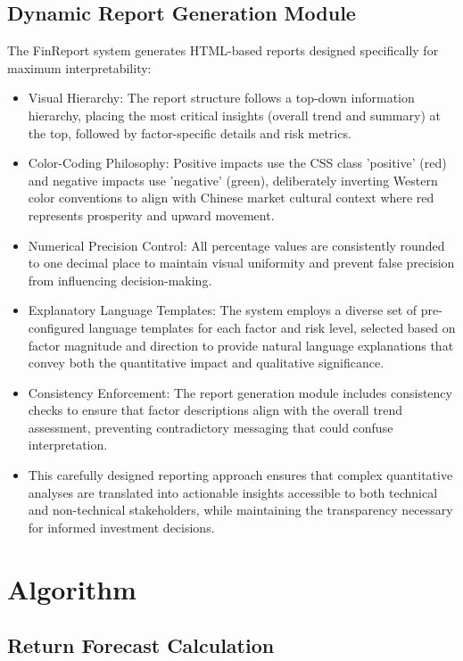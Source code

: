 \documentclass[3p,times,procedia]{elsarticle}
\begin{document}
\subsection{Dynamic Report Generation Module}
The FinReport system generates HTML-based reports designed specifically for maximum interpretability:
\begin{itemize}
    \item Visual Hierarchy: The report structure follows a top-down information hierarchy, placing the most critical insights (overall trend and summary) at the top, followed by factor-specific details and risk metrics.
\item Color-Coding Philosophy: Positive impacts use the CSS class 'positive' (red) and negative impacts use 'negative' (green), deliberately inverting Western color conventions to align with Chinese market cultural context where red represents prosperity and upward movement.
\item Numerical Precision Control: All percentage values are consistently rounded to one decimal place to maintain visual uniformity and prevent false precision from influencing decision-making.
\item Explanatory Language Templates: The system employs a diverse set of pre-configured language templates for each factor and risk level, selected based on factor magnitude and direction to provide natural language explanations that convey both the quantitative impact and qualitative significance.
\item Consistency Enforcement: The report generation module includes consistency checks to ensure that factor descriptions align with the overall trend assessment, preventing contradictory messaging that could confuse interpretation.
\item This carefully designed reporting approach ensures that complex quantitative analyses are translated into actionable insights accessible to both technical and non-technical stakeholders, while maintaining the transparency necessary for informed investment decisions.
\end{itemize}

\vspace{0.20cm}
\section{Algorithm}

\subsection{Return Forecast Calculation}
\end{document}
